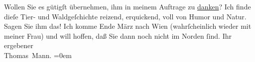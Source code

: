 \begin{ledgroupsized}[t]{13cm}
                    Wollen Sie es gütigſt übernehmen, ihm in meinem Auftrage zu \uline{danken}? Ich finde dieſe Tier- und Waldgeſchichte reizend,
                    erquickend, voll von Humor und Natur. Sagen Sie ihm das!\pend
           \pstart
           Ich komme Ende März nach Wien (wahrſcheinlich
                    wieder mit meiner Frau)
                    und will hoffen, daß Sie dann noch nicht im Norden ſind.\pend
           \pstart
           Ihr ergebener{\\[\baselineskip]}\spacefill\mbox{Thomas Mann.}\pend
           \leftskip=0em{}          \endnumbering{}\end{ledgroupsized}  \newcommand{\dateiname}{L02397}\newcommand{\titel}{Thomas Mann an Arthur Schnitzler, 20. 2. 1923}\newcommand{\editorInnen}{Martin Anton Müller und Gerd-Hermann Susen}
      